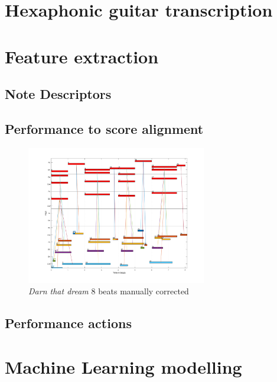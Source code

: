 \section{Hexaphonic guitar transcription}


\section{Feature extraction}


\subsection{Note Descriptors}


\subsection{Performance to score alignment}


\begin{figure}
  \caption{\textit{Darn that dream} 8 beats manually corrected}
  \centering
    \includegraphics[width=0.7\textwidth]{Figures/Darn_8b_corrected.pdf}
\end{figure}
\subsection{Performance actions}
\section{Machine Learning modelling}
\cleardoublepage

